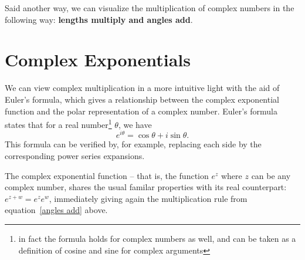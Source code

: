 \documentclass[12pt]{report}
\theoremstyle{plain}
\begin{document}
Said another way, we can visualize the multiplication of complex numbers in the following way: \textbf{lengths multiply and angles add}.

\section{Complex Exponentials} \label{complex exponentials}

We can view complex multiplication in a more intuitive light with the aid of Euler's formula, which gives a relationship between the complex exponential function and the polar representation of a complex number. Euler's formula states that for a real number\footnote{in fact the formula holds for complex numbers as well, and can be taken as a definition of cosine and sine for complex arguments} $\theta$, we have
\[e^{i \theta} = \cos \theta + i \sin \theta. \]
This formula can be verified by, for example, replacing each side by the corresponding power series expansions.

The complex exponential function -- that is, the function $e^z$ where $z$ can be any complex number, shares the usual familar properties with its real counterpart: $e^{z + w} = e^z e^w$, immediately giving again the multiplication rule from equation~\ref{angles add} above.

\printindex
\end{document}
